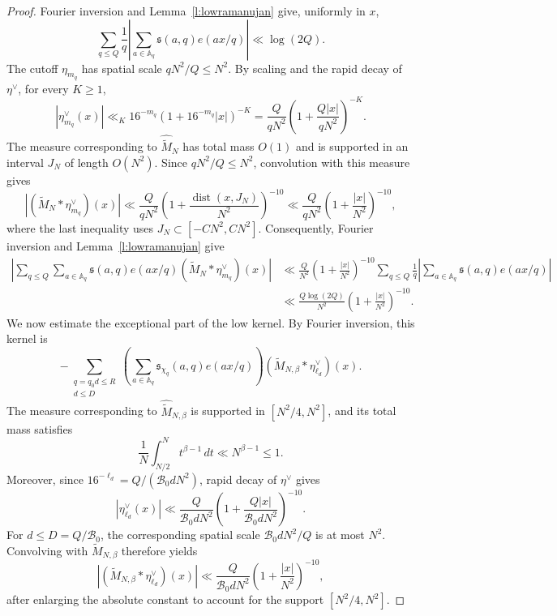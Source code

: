 \documentclass[12pt,reqno]{amsart}
\numberwithin{equation}{section}
\theoremstyle{definition}
\theoremstyle{remark}
\begin{document}
\begin{proof}
Fourier inversion and Lemma~\ref{l:lowramanujan} give, uniformly in \(x\),
\[
 \sum_{q\leq Q}\frac1q
 \left|
 \sum_{a\in\mathbb A_q}\mathfrak s(a,q)e(ax/q)
 \right|
 \ll\log(2Q).
\]
The cutoff \(\eta_{m_q}\) has spatial scale
\(qN^2/Q\leq N^2\). By scaling and the rapid decay of \(\eta^\vee\), for every \(K\geq1\),
\[
 |\eta_{m_q}^\vee(x)|
 \ll_K 16^{-m_q}(1+16^{-m_q}|x|)^{-K}
 =
 \frac{Q}{qN^2}
 \left(1+\frac{Q|x|}{qN^2}\right)^{-K}.
\]
The measure corresponding to \(\widehat{\widetilde M}_N\) has total
mass \(O(1)\) and is supported in an interval \(J_N\) of length
\(O(N^2)\).  Since \(qN^2/Q\leq N^2\), convolution with this measure
gives
\[
 |(\widetilde M_N*\eta_{m_q}^\vee)(x)|
 \ll
 \frac{Q}{qN^2}
 \left(1+\frac{\operatorname{dist}(x,J_N)}{N^2}\right)^{-10}
 \ll
 \frac{Q}{qN^2}
 \left(1+\frac{|x|}{N^2}\right)^{-10},
\]
where the last inequality uses \(J_N\subset[-CN^2,CN^2]\).
Consequently, Fourier inversion and Lemma~\ref{l:lowramanujan} give
\begin{align*}
 |\sum_{q\leq Q}\sum_{a\in\mathbb A_q}
 \mathfrak s(a,q)e(ax/q)(\widetilde M_N\ast 
 \eta_{m_q}^{\vee})(x)|
 &\ll
 \frac{Q}{N^2}\left(1+\frac{|x|}{N^2}\right)^{-10}
 \sum_{q\leq Q}\frac1q
 \left|\sum_{a\in\mathbb A_q}
 \mathfrak s(a,q)e(ax/q)\right|\\
 &\ll
 \frac{Q\log(2Q)}{N^2}
 \left(1+\frac{|x|}{N^2}\right)^{-10}.
\end{align*}
We now estimate the exceptional part of the low kernel.  By Fourier
inversion, this kernel is
\[
 -\sum_{\substack{q=q_0d\leq R\\d\leq D}}
 \left(
 \sum_{a\in\mathbb A_q}
 \mathfrak s_{\chi_q}(a,q)e(ax/q)
 \right)
 (\widetilde M_{N,\beta}*\eta_{\ell_d}^{\vee})(x).
\]
The measure corresponding to
\(\widehat{\widetilde M}_{N,\beta}\) is supported in
\([N^2/4,N^2]\), and its total mass satisfies
\[
 \frac1N\int_{N/2}^{N}t^{\beta-1}\,dt
 \ll N^{\beta-1}\leq1.
\]
Moreover, since
\(16^{-\ell_d}=Q/(\mathcal B_0dN^2)\), rapid decay of
\(\eta^\vee\) gives
\[
 |\eta_{\ell_d}^{\vee}(x)|
 \ll
 \frac{Q}{\mathcal B_0dN^2}
 \left(
 1+\frac{Q|x|}{\mathcal B_0dN^2}
 \right)^{-10}.
\]
For \(d\leq D=Q/\mathcal B_0\), the corresponding spatial scale
\(\mathcal B_0dN^2/Q\) is at most \(N^2\).  Convolving with
\(\widetilde M_{N,\beta}\) therefore yields
\[
 |(\widetilde M_{N,\beta}*\eta_{\ell_d}^{\vee})(x)|
 \ll
 \frac{Q}{\mathcal B_0dN^2}
 \left(1+\frac{|x|}{N^2}\right)^{-10},
\]
after enlarging the absolute constant to account for the support
\([N^2/4,N^2]\).


\end{proof}
\end{document}
